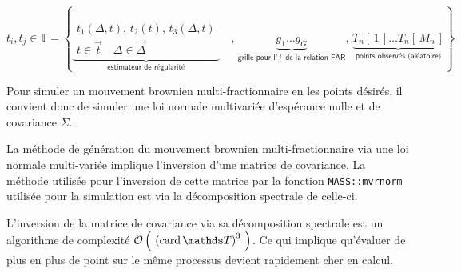 \begin{equation*}
	t_i, t_j \in
	\mathds T = \left\{
	\underbrace{
		\begin{array}{c}
			t_1(\Delta, t), \, t_2(t), \, t_3(\Delta, t )
			\\
			t \in \vec t \quad \Delta \in \overrightarrow \Delta
		\end{array}
	}_{
	\textsf{estimateur de régularité}
	}
	\quad , \,
	\underbrace{
		g_1 \dots g_G
	}_{
	\textsf{grille pour l'} \int \textsf{ de la relation FAR}
	}
	, \,
	\underbrace{
	T_n[\,1\,] \dots T_n[\,M_n\,]
	}_{
	\textsf{points observés (aléatoire)}
	}
	\right\}
\end{equation*}

Pour simuler un mouvement brownien multi-fractionnaire en les points désirés, il convient donc de simuler une loi normale multivariée d'espérance nulle et de covariance $\Sigma$.

\begin{rem}
	La méthode de génération du mouvement brownien multi-fractionnaire via une loi normale multi-variée implique l'inversion d'une matrice de covariance. La méthode utilisée pour l'inversion de cette matrice par la fonction \texttt{MASS::mvrnorm} utilisée pour la simulation est via la décomposition spectrale de celle-ci.

	L'inversion de la matrice de covariance via sa décomposition spectrale est un algorithme de complexité $\grando{{(\operatorname{card}\mathds T)}^3}$. Ce qui implique qu'évaluer de plus en plus de point sur le même processus devient rapidement cher en calcul.
	\label{rem:inversion_matrice_covariance_mfbm_informel}
\end{rem}
